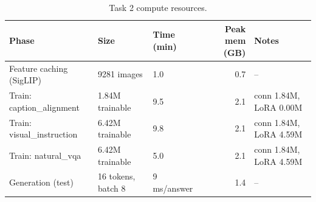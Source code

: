 \begin{table}[t]
\centering
\scriptsize
\begin{tabular}{lllrl}
\toprule
Phase & Size & Time (min) & Peak mem (GB) & Notes \\
\midrule
Feature caching (SigLIP) & 9281 images & 1.0 & 0.7 & -- \\
Train: caption_alignment & 1.84M trainable & 9.5 & 2.1 & conn 1.84M, LoRA 0.00M \\
Train: visual_instruction & 6.42M trainable & 9.8 & 2.1 & conn 1.84M, LoRA 4.59M \\
Train: natural_vqa & 6.42M trainable & 5.0 & 2.1 & conn 1.84M, LoRA 4.59M \\
Generation (test) & 16 tokens, batch 8 & 9 ms/answer & 1.4 & -- \\
\bottomrule
\end{tabular}
\caption{Task 2 compute resources.}
\label{tab:t2-res}
\end{table}

